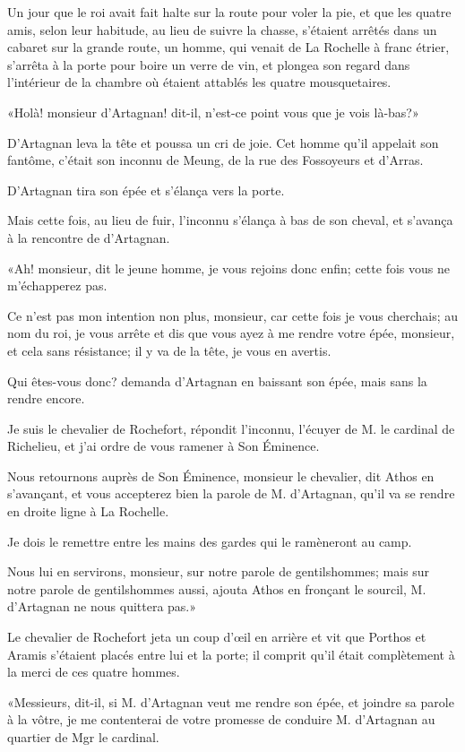 Un jour que le roi avait fait halte sur la route pour voler la pie, et que les quatre amis, selon leur habitude, au lieu de suivre la chasse, s'étaient arrêtés dans un cabaret sur la grande route, un homme, qui venait de La Rochelle à franc étrier, s'arrêta à la porte pour boire un verre de vin, et plongea son regard dans l'intérieur de la chambre où étaient attablés les quatre mousquetaires. 

«Holà! monsieur d'Artagnan! dit-il, n'est-ce point vous que je vois là-bas?» 

D'Artagnan leva la tête et poussa un cri de joie. Cet homme qu'il appelait son fantôme, c'était son inconnu de Meung, de la rue des Fossoyeurs et d'Arras. 

D'Artagnan tira son épée et s'élança vers la porte. 

Mais cette fois, au lieu de fuir, l'inconnu s'élança à bas de son cheval, et s'avança à la rencontre de d'Artagnan. 

«Ah! monsieur, dit le jeune homme, je vous rejoins donc enfin; cette fois vous ne m'échapperez pas. 

\speak  Ce n'est pas mon intention non plus, monsieur, car cette fois je vous cherchais; au nom du roi, je vous arrête et dis que vous ayez à me rendre votre épée, monsieur, et cela sans résistance; il y va de la tête, je vous en avertis. 

\speak  Qui êtes-vous donc? demanda d'Artagnan en baissant son épée, mais sans la rendre encore. 

\speak  Je suis le chevalier de Rochefort, répondit l'inconnu, l'écuyer de M. le cardinal de Richelieu, et j'ai ordre de vous ramener à Son Éminence. 

\speak  Nous retournons auprès de Son Éminence, monsieur le chevalier, dit Athos en s'avançant, et vous accepterez bien la parole de M. d'Artagnan, qu'il va se rendre en droite ligne à La Rochelle. 

\speak  Je dois le remettre entre les mains des gardes qui le ramèneront au camp. 

\speak  Nous lui en servirons, monsieur, sur notre parole de gentilshommes; mais sur notre parole de gentilshommes aussi, ajouta Athos en fronçant le sourcil, M. d'Artagnan ne nous quittera pas.» 

Le chevalier de Rochefort jeta un coup d'œil en arrière et vit que Porthos et Aramis s'étaient placés entre lui et la porte; il comprit qu'il était complètement à la merci de ces quatre hommes. 

«Messieurs, dit-il, si M. d'Artagnan veut me rendre son épée, et joindre sa parole à la vôtre, je me contenterai de votre promesse de conduire M. d'Artagnan au quartier de Mgr le cardinal. 

